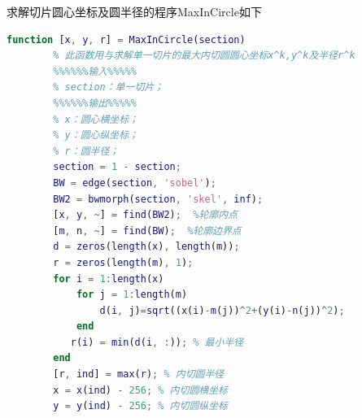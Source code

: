         \par
        求解切片圆心坐标及圆半径的程序MaxInCircle如下
        \begin{lstlisting}[language = Matlab]
        function [x, y, r] = MaxInCircle(section)
        % 此函数用与求解单一切片的最大内切圆圆心坐标x^k,y^k及半径r^k
        %%%%%%输入%%%%%
        % section：单一切片；
        %%%%%%输出%%%%%
        % x：圆心横坐标；
        % y：圆心纵坐标；
        % r：圆半径；
        section = 1 - section;
        BW = edge(section, 'sobel');
        BW2 = bwmorph(section, 'skel', inf);
        [x, y, ~] = find(BW2);  %轮廓内点
        [m, n, ~] = find(BW);  %轮廓边界点
        d = zeros(length(x), length(m));
        r = zeros(length(m), 1);
        for i = 1:length(x)
            for j = 1:length(m)
                d(i, j)=sqrt((x(i)-m(j))^2+(y(i)-n(j))^2);
            end
           r(i) = min(d(i, :)); % 最小半径
        end
        [r, ind] = max(r); % 内切圆半径
        x = x(ind) - 256; % 内切圆横坐标
        y = y(ind) - 256; % 内切圆纵坐标
        \end{lstlisting}
